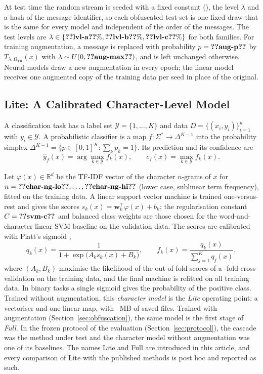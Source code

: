 At test time the random stream is seeded with a fixed constant (), the level $\lambda$ and a hash of the message identifier, so each obfuscated test set is one fixed draw that is the same for every model and independent of the order of the messages. The test levels are $\lambda\in\{\val{lvl-a}\%,\val{lvl-b}\%,\val{lvl-c}\%\}$ for both families. For training augmentation, a message is replaced with probability $p=\val{aug-p}$ by $T_{\lambda,\Omega_{\mathrm{TR}}}(x)$ with $\lambda\sim U(0,\val{aug-max})$, and is left unchanged otherwise. Neural models draw a new augmentation in every epoch; the linear model receives one augmented copy of the training data per seed in place of the original.

\subsection{Lite: A Calibrated Character-Level Model}\label{sec:lite}

A classification task has a label set $\mathcal{Y}=\{1,\dots,K\}$ and data $D=\{(x_i,y_i)\}_{i=1}^{n}$ with $y_i\in\mathcal{Y}$. A probabilistic classifier is a map $f:\Sigma^{*}\to\Delta^{K-1}$ into the probability simplex $\Delta^{K-1}=\{p\in[0,1]^K:\sum_k p_k=1\}$. Its prediction and its confidence are
\begin{equation}\label{eq:pred}
\hat{y}_f(x)=\arg\max_{k\in\mathcal{Y}} f_k(x),\qquad c_f(x)=\max_{k\in\mathcal{Y}} f_k(x).
\end{equation}

Let $\varphi(x)\in\mathbb{R}^{d}$ be the TF-IDF vector of the character $n$-grams of $x$ for $n=\val{char-ng-lo},\dots,\val{char-ng-hi}$ (lower case, sublinear term frequency), fitted on the training data. A linear support vector machine \cite{cortes1995,joachims1998} is trained one-versus-rest and gives the scores $s_k(x)=\mathbf{w}_k^{\top}\varphi(x)+b_k$; the regularisation constant $C=\val{svm-c}$ and balanced class weights are those chosen for the word-and-character linear SVM baseline on the validation data. The scores are calibrated with Platt's sigmoid \cite{niculescu2005},
\begin{equation}\label{eq:platt}
q_k(x)=\frac{1}{1+\exp\bigl(A_k s_k(x)+B_k\bigr)},\qquad f_k(x)=\frac{q_k(x)}{\sum_{j=1}^{K}q_j(x)},
\end{equation}
where $(A_k,B_k)$ maximise the likelihood of the out-of-fold scores of a -fold cross-validation on the training data, and the final machine is refitted on all training data. In binary tasks a single sigmoid gives the probability of the positive class. Trained without augmentation, this \emph{character model} is the \emph{Lite} operating point: a vectoriser and one linear map, with ~MB of saved files. Trained with augmentation (Section~\ref{sec:obfuscation}), the same model is the first stage of \emph{Full}. In the frozen protocol of the evaluation (Section~\ref{sec:protocol}), the cascade was the method under test and the character model without augmentation was one of its baselines. The names Lite and Full are introduced in this article, and every comparison of Lite with the published methods is post hoc and reported as such.

